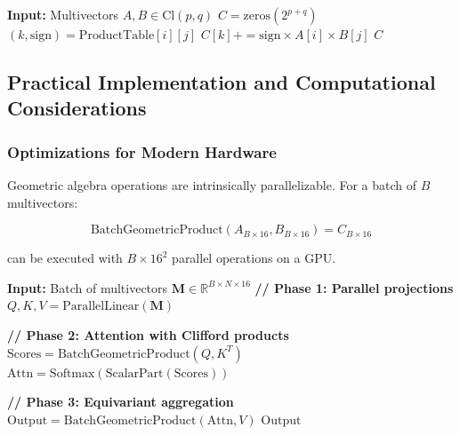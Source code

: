 \begin{algorithm}[H]
\caption{Efficient Geometric Product}
\label{alg:producto_geometrico_eficiente}
\begin{algorithmic}[1]
    \State \textbf{Input:} Multivectors $A, B \in \text{Cl}(p,q)$
        \State $C = \text{zeros}(2^{p+q})$
                \State $(k, \text{sign}) = \text{ProductTable}[i][j]$
                \State $C[k] += \text{sign} \times A[i] \times B[j]$
            \EndFor
        \EndFor
        \State \Return $C$
    \EndFunction
\end{algorithmic}
\end{algorithm}

\subsection{Practical Implementation and Computational Considerations}

\subsubsection{Optimizations for Modern Hardware}

\begin{definition}\label{def:paralelizacion_ga}
Geometric algebra operations are intrinsically parallelizable. For a batch of $B$ multivectors:

\begin{equation}
    \text{BatchGeometricProduct}(A_{B \times 16}, B_{B \times 16}) = C_{B \times 16}
\end{equation}

can be executed with $B \times 16^2$ parallel operations on a GPU.
\end{definition}

\begin{algorithm}[H]
\caption{GPU-Optimized Implementation of GATr}
\label{alg:gatr_gpu}
\begin{algorithmic}[1]
    \State \textbf{Input:} Batch of multivectors $\mathbf{M} \in \mathbb{R}^{B \times N \times 16}$
        \State \textbf{// Phase 1: Parallel projections}
        \State $Q, K, V = \text{ParallelLinear}(\mathbf{M})$ 

        \State \textbf{// Phase 2: Attention with Clifford products}
        \State $\text{Scores} = \text{BatchGeometricProduct}(Q, K^T)$ 
        \State $\text{Attn} = \text{Softmax}(\text{ScalarPart}(\text{Scores}))$

        \State \textbf{// Phase 3: Equivariant aggregation}
        \State $\text{Output} = \text{BatchGeometricProduct}(\text{Attn}, V)$
        \State \Return $\text{Output}$
    \EndFunction
\end{algorithmic}
\end{algorithm}

